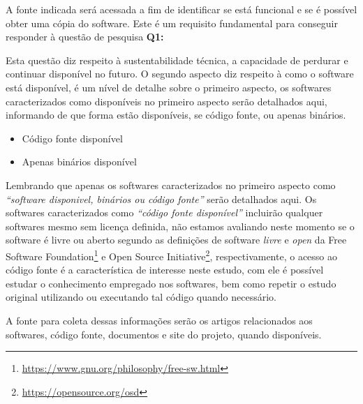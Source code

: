 A fonte indicada será acessada a fim de identificar se está funcional e se é
possível obter uma cópia do software. Este é um requisito fundamental para
conseguir responder à questão de pesquisa {\bf Q1:} \QuestaoUm


Esta questão diz respeito à sustentabilidade técnica, a capacidade de perdurar
e continuar disponível no futuro. O segundo aspecto diz respeito à como o
software está disponível, é um nível de detalhe sobre o primeiro aspecto, os
softwares caracterizados como disponíveis no primeiro aspecto serão detalhados
aqui, informando de que forma estão disponíveis, se código fonte, ou apenas
binários.

\begin{itemize}
  \item Código fonte disponível
  \item Apenas binários disponível
\end{itemize}


Lembrando que apenas os softwares caracterizados no primeiro aspecto como
{\it``software disponivel, binários ou código fonte''} serão detalhados aqui.
Os softwares caracterizados como {\it ``código fonte disponível''} incluirão
qualquer softwares mesmo sem licença definida, não estamos avaliando neste
momento se o software é livre ou aberto segundo as definições de software {\it
livre} e {\it open} da Free Software
Foundation\footnote{\url{https://www.gnu.org/philosophy/free-sw.html}} e Open
Source Initiative\footnote{\url{https://opensource.org/osd}}, respectivamente,
o acesso ao código fonte é a característica de interesse neste estudo, com ele
é possível estudar o conhecimento empregado nos softwares, bem como repetir o
estudo original utilizando ou executando tal código quando necessário.

A fonte para coleta dessas informações serão os artigos relacionados aos
softwares, código fonte, documentos e site do projeto, quando disponíveis.

